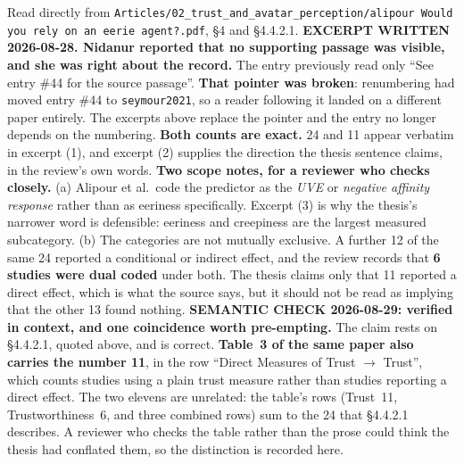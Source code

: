 \documentclass[11pt, a4paper]{article}
\begin{document}
\begin{Form}
  {Read directly from \texttt{\footnotesize Articles/02\_trust\_and\_avatar\_perception/alipour Would you rely on an eerie agent?.pdf}, \S4 and \S4.4.2.1. \textbf{EXCERPT WRITTEN 2026-08-28. Nidanur reported that no supporting passage was visible, and she was right about the record.} The entry previously read only ``See entry \#44 for the source passage''. \textbf{That pointer was broken}: renumbering had moved entry \#44 to \texttt{seymour2021}, so a reader following it landed on a different paper entirely. The excerpts above replace the pointer and the entry no longer depends on the numbering. \textbf{Both counts are exact.} 24 and 11 appear verbatim in excerpt (1), and excerpt (2) supplies the direction the thesis sentence claims, in the review's own words. \textbf{Two scope notes, for a reviewer who checks closely.} (a) Alipour et al.\ code the predictor as the \emph{UVE} or \emph{negative affinity response} rather than as eeriness specifically. Excerpt (3) is why the thesis's narrower word is defensible: eeriness and creepiness are the largest measured subcategory. (b) The categories are not mutually exclusive. A further 12 of the same 24 reported a conditional or indirect effect, and the review records that \textbf{6 studies were dual coded} under both. The thesis claims only that 11 reported a direct effect, which is what the source says, but it should not be read as implying that the other 13 found nothing. \textbf{SEMANTIC CHECK 2026-08-29: verified in context, and one coincidence worth pre-empting.} The claim rests on \S4.4.2.1, quoted above, and is correct. \textbf{Table~3 of the same paper also carries the number 11}, in the row ``Direct Measures of Trust $\to$ Trust'', which counts studies using a plain trust measure rather than studies reporting a direct effect. The two elevens are unrelated: the table's rows (Trust~11, Trustworthiness~6, and three combined rows) sum to the 24 that \S4.4.2.1 describes. A reviewer who checks the table rather than the prose could think the thesis had conflated them, so the distinction is recorded here.}



\end{Form}
\end{document}
